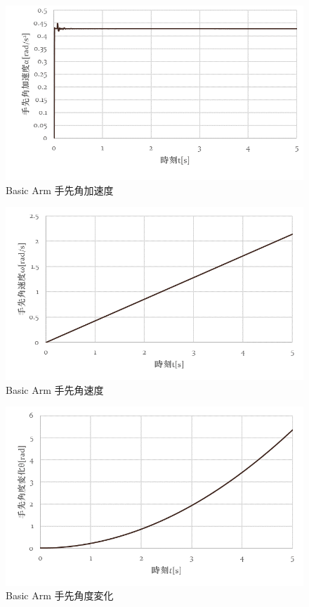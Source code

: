 \documentclass[10pt,b5paper,papersize,dvipdfmx]{jsbook}
\begin{document}
\begin{figure}[htbp]
  \centering
  \includegraphics[width=12.6cm]{img/robot06.png}
  \caption{Basic Arm 手先角加速度}
  \label{Basic Arm 手先角加速度}
\end{figure}
\begin{figure}[htbp]
  \centering
  \includegraphics[width=12cm]{img/robot07.png}
  \caption{Basic Arm 手先角速度}
  \label{fig:Basic Arm 手先角速度}
\end{figure}
\begin{figure}[htbp]
  \centering
  \includegraphics[width=12cm]{img/robot08.png}
  \caption{Basic Arm 手先角度変化}
  \label{fig:Basic Arm 手先角度変化2}
\end{figure}
\end{document}
